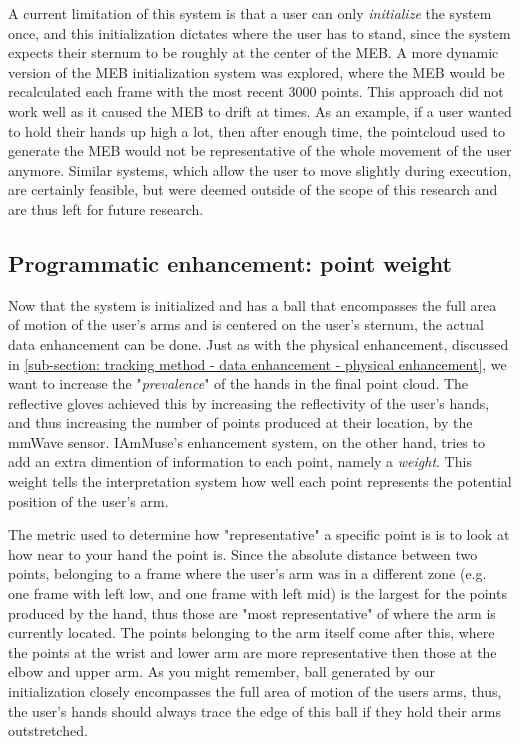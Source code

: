 A current limitation of this system is that a user can only \textit{initialize} the system once, and this initialization dictates where the user has to stand, since the system expects their sternum to be roughly at the center of the MEB.
A more dynamic version of the MEB initialization system was explored, where the MEB would be recalculated each frame with the most recent 3000 points.
This approach did not work well as it caused the MEB to drift at times. 
As an example, if a user wanted to hold their hands up high a lot, then after enough time, the pointcloud used to generate the MEB would not be representative of the whole movement of the user anymore.
Similar systems, which allow the user to move slightly during execution, are certainly feasible, but were deemed outside of the scope of this research and are thus left for future research.


\subsection{Programmatic enhancement: point weight}
\label{sub-section: tracking method - data enhancement - programmatic enhancement}

Now that the system is initialized and has a ball that encompasses the full area of motion of the user's arms and is centered on the user's sternum, the actual data enhancement can be done.
Just as with the physical enhancement, discussed in \cref{sub-section: tracking method - data enhancement - physical enhancement}, we want to increase the "\textit{prevalence}" of the hands in the final point cloud.
The reflective gloves achieved this by increasing the reflectivity of the user's hands, and thus increasing the number of points produced at their location, by the mmWave sensor.
IAmMuse's enhancement system, on the other hand, tries to add an extra dimention of information to each point, namely a \textit{weight}.
This weight tells the interpretation system how well each point represents the potential position of the user's arm.

The metric used to determine how "representative" a specific point is is to look at how near to your hand the point is.
Since the absolute distance between two points, belonging to a frame where the user's arm was in a different zone (e.g. one frame with left low, and one frame with left mid) is the largest for the points produced by the hand, thus those are "most representative" of where the arm is currently located.
The points belonging to the arm itself come after this, where the points at the wrist and lower arm are more representative then those at the elbow and upper arm.
As you might remember, ball generated by our initialization closely encompasses the full area of motion of the users arms, thus, the user's hands should always trace the edge of this ball if they hold their arms outstretched.

